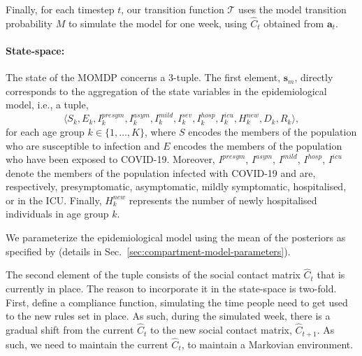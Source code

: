 \documentclass{article}
\newcommand{\mdptransition}{\mathcal{T}}
\newcommand{\mdpstate}{\mathbf{s}}
\newcommand{\mdpaction}{\mathbf{a}}
\newcommand{\momdpname}{MOBelCov}
\newcommand{\agegroups}{K}
\newcommand{\ltuple}{\langle}
\newcommand{\rtuple}{\rangle}
\begin{document}
Finally, for each timestep $t$, our transition function $\mdptransition$ uses the model transition probability $M$ to simulate the model for one week, using $\hat{C}_t$ obtained from $\mdpaction_t$.


\paragraph{State-space:} The state of the MOMDP concerns a 3-tuple. The first element, $\mdpstate_m$, directly corresponds to the aggregation of the state variables in the epidemiological model, i.e., a tuple,
\begin{equation}
    \ltuple S_k, E_k, I_k^{presym}, I_k^{asym}, I_k^{mild}, I_k^{sev}, I_k^{hosp}, I_k^{icu}, H^{new}_k, D_k, R_k \rtuple ,
\end{equation}
%
for each age group $k \in \{1, \ldots, \agegroups\}$, where $S$ encodes the members of the population who are susceptible to infection and $E$ encodes the members of the population who have been exposed to COVID-19. Moreover, $I^{presym}$, $I^{asym}$, $I^{mild}$, $I^{hosp}$, $I^{icu}$ denote the members of the population infected with COVID-19 and are, respectively, presymptomatic, asymptomatic, mildly symptomatic, hospitalised, or in the ICU. Finally, $H^{new}_k$ represents the number of newly hospitalised individuals in age group $k$.

We parameterize the epidemiological model using the mean of the posteriors as specified by \citet{abrams2021modelling} (details in Sec.~\ref{sec:compartment-model-parameters}).

The second element of the tuple consists of the social contact matrix $\hat{C}_t$ that is currently in place. The reason to incorporate it in the state-space is two-fold. First, \citet{abrams2021modelling} define a compliance function, simulating the time people need to get used to the new rules set in place. As such, during the simulated week, there is a gradual shift from the current $\hat{C}_t$ to the new social contact matrix, $\hat{C}_{t+1}$. As such, we need to maintain the current $\hat{C}_t$, to maintain a Markovian environment.
\end{document}
